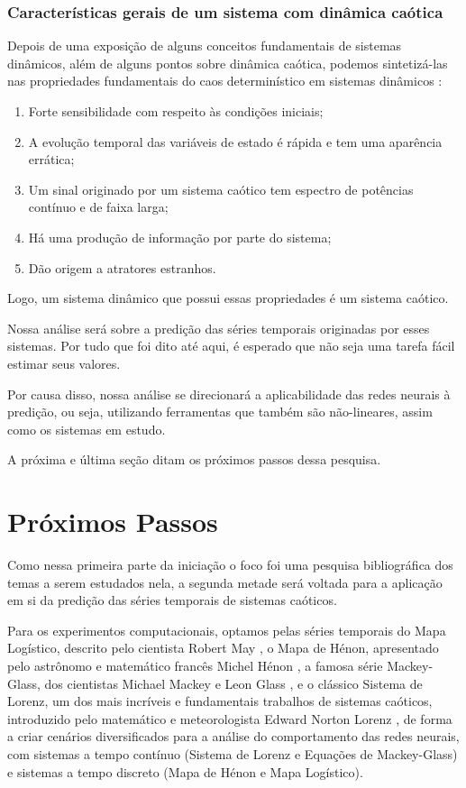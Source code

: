 \documentclass[a4paper, 12pt]{article}
\begin{document}
\subsubsection{Características gerais de um sistema com dinâmica caótica}
Depois de uma exposição de alguns conceitos fundamentais de sistemas dinâmicos, além de alguns pontos sobre dinâmica caótica, podemos sintetizá-las nas propriedades fundamentais do caos determinístico em sistemas dinâmicos \cite{attux2001dinamica}:
\begin{enumerate}
\item Forte sensibilidade com respeito às condições iniciais;
\item A evolução temporal das variáveis de estado é rápida e tem uma aparência errática;
\item Um sinal originado por um sistema caótico tem espectro de potências contínuo e de faixa larga;
\item Há uma produção de informação por parte do sistema;
\item Dão origem a atratores estranhos.
\end{enumerate}

Logo, um sistema dinâmico que possui essas propriedades é um sistema caótico.

Nossa análise será sobre a predição das séries temporais originadas por esses sistemas. Por tudo que foi dito até aqui, é esperado que não seja uma tarefa fácil estimar seus valores.

Por causa disso, nossa análise se direcionará a aplicabilidade das redes neurais à predição, ou seja, utilizando ferramentas que também são não-lineares, assim como os sistemas em estudo.

A próxima e última seção ditam os próximos passos dessa pesquisa.

\section{Próximos Passos}

Como nessa primeira parte da iniciação o foco foi uma pesquisa bibliográfica dos temas a serem estudados nela, a segunda metade será voltada para a aplicação em si da predição das séries temporais de sistemas caóticos.

Para os experimentos computacionais, optamos pelas séries temporais do Mapa Logístico, descrito pelo cientista Robert May \cite{may1976simple}, o Mapa de Hénon, apresentado pelo astrônomo e matemático francês Michel Hénon \cite{henon1976two}, a famosa série Mackey-Glass, dos cientistas Michael Mackey e Leon Glass \cite{mackey1977oscillation}, e o clássico Sistema de Lorenz, um dos  mais incríveis e fundamentais trabalhos de sistemas caóticos, introduzido pelo matemático e meteorologista Edward Norton Lorenz \cite{lorenz1963deterministic}, de forma a criar cenários diversificados para a análise do comportamento das redes neurais, com sistemas a tempo contínuo (Sistema de Lorenz e Equações de Mackey-Glass) e sistemas a tempo discreto (Mapa de Hénon e Mapa Logístico).
\end{document}
